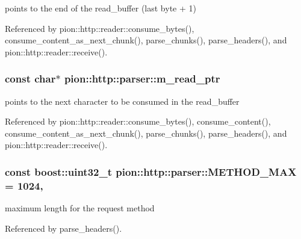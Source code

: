 points to the end of the read\-\_\-buffer (last byte + 1) 



Referenced by pion\-::http\-::reader\-::consume\-\_\-bytes(), consume\-\_\-content\-\_\-as\-\_\-next\-\_\-chunk(), parse\-\_\-chunks(), parse\-\_\-headers(), and pion\-::http\-::reader\-::receive().

\hypertarget{classpion_1_1http_1_1parser_a3ca52095a690cb92197755a5eea24cd7}{
\subsubsection[{m\-\_\-read\-\_\-ptr}]{\setlength{\rightskip}{0pt plus 5cm}const char$\ast$ pion\-::http\-::parser\-::m\-\_\-read\-\_\-ptr\hspace{0.3cm}{\ttfamily [protected]}}}\label{classpion_1_1http_1_1parser_a3ca52095a690cb92197755a5eea24cd7}


points to the next character to be consumed in the read\-\_\-buffer 



Referenced by pion\-::http\-::reader\-::consume\-\_\-bytes(), consume\-\_\-content(), consume\-\_\-content\-\_\-as\-\_\-next\-\_\-chunk(), parse\-\_\-chunks(), parse\-\_\-headers(), and pion\-::http\-::reader\-::receive().

\hypertarget{classpion_1_1http_1_1parser_ad781cc2dcdb333a8d286a4534d4509cb}{
\subsubsection[{M\-E\-T\-H\-O\-D\-\_\-\-M\-A\-X}]{\setlength{\rightskip}{0pt plus 5cm}const boost\-::uint32\-\_\-t pion\-::http\-::parser\-::\-M\-E\-T\-H\-O\-D\-\_\-\-M\-A\-X = 1024\hspace{0.3cm}{\ttfamily [static]}, {\ttfamily [protected]}}}\label{classpion_1_1http_1_1parser_ad781cc2dcdb333a8d286a4534d4509cb}


maximum length for the request method 



Referenced by parse\-\_\-headers().

